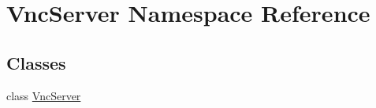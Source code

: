 \hypertarget{namespaceVncServer}{
\section{VncServer Namespace Reference}
\label{namespaceVncServer}
}
\subsection*{Classes}
\begin{DoxyCompactItemize}
\item 
class \hyperlink{classVncServer_1_1VncServer}{VncServer}
\end{DoxyCompactItemize}
